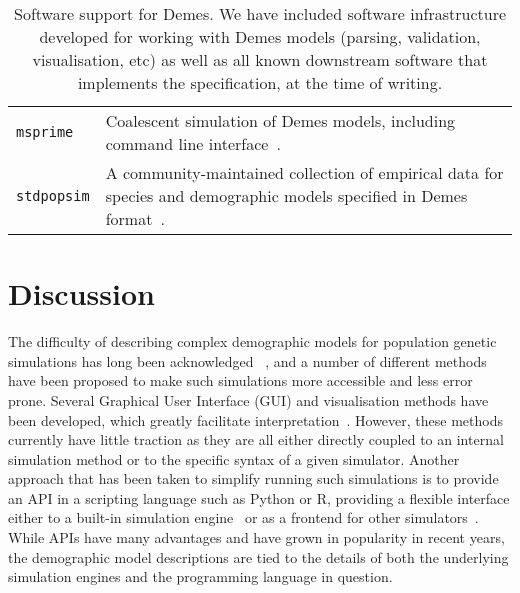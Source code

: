\documentclass[11pt]{article}
\newcommand{\msprime}[0]{\texttt{msprime}}
\newcommand{\stdpopsim}[0]{\texttt{stdpopsim}}
\begin{document}
\begin{table}
\begin{center}
\begin{tabular}{lp{12cm}}
\msprime &
    Coalescent simulation of Demes models, including command line
    interface~\citep{kelleher2016efficient,kelleher2020coalescent}.\\

\stdpopsim &
    A community-maintained collection of empirical data for species
    and demographic models specified in Demes
    format~\citep{adrion2020community}.\\

\bottomrule
\end{tabular}
\end{center}
\caption{\label{tab-software}
Software support for Demes. We have included software infrastructure developed
for working with Demes models (parsing, validation, visualisation, etc)
as well as all known downstream software that implements the specification,
at the time of writing.}
\end{table}

\section*{Discussion}

The difficulty of describing complex demographic models
for population genetic simulations has long been acknowledged
~\citep[][e.g.]{antao2007modeler4simcoal2}, %
and a number of different methods have been proposed to
make such simulations more accessible and less error prone.
Several Graphical User Interface (GUI) and visualisation
methods have been developed, which greatly facilitate
interpretation~\citep{mailund2005coasim,antao2007modeler4simcoal2,
ewing2010msms,zhou2018popdemog}. However, these methods
currently have little traction as they are all either directly coupled
to an internal simulation method or to the specific syntax
of a given simulator. Another approach that has been taken to
simplify running such simulations is to provide an API in a
scripting language such as Python or R, providing a flexible
interface either to a built-in simulation
engine~\citep{thornton2014cpp,kelleher2016efficient,haller2017flexible}
or as a frontend for other simulators~\citep{staab2016coala}.
While APIs have many advantages and have grown in popularity in
recent years, the demographic model descriptions are tied
to the details of both the underlying simulation engines
and the programming language in question.
\end{document}
